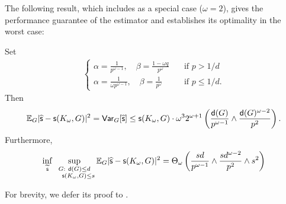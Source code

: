 The following result, which includes  as a special case ($\omega=2$), gives the performance guarantee of the estimator  and establishes its optimality in the worst case:
\begin{theorem}[Cliques]
\label{thm:neighborhood_clique}
Set
\begin{align}
\begin{cases}
  \alpha =  \frac{1}{p^{\omega-1}}, \quad \beta = \frac{1-\omega q}{p^{\omega}}  & \quad \text{if } p > 1/d \\
  \alpha=  \frac{1}{\omega p^{\omega-1}}, \quad \beta = \frac{1}{p^{\omega}}  & \quad \text{if } p \leq 1/d.
  \end{cases}
\label{eq:alphabeta-general}
\end{align}
Then
\[
\mathbb{E}_G|\widehat{\mathsf{s}}-\mathsf{s}(K_{\omega}, G)|^2 = 
\mathsf{Var}_G[\widehat{\mathsf{s}}]
\leq \mathsf{s}(K_{\omega}, G) \cdot \omega^3 2^{\omega+1} \left(  \frac{ {\mathsf{d}}(G)}{p^{\omega-1}} \wedge  \frac{{\mathsf{d}}(G)^{\omega-2}}{p^2} \right).
\]
Furthermore,
\[
\inf_{\widetilde{\mathsf{s}}} \sup_{\substack{G: ~{\mathsf{d}}(G)\leq d\\ ~~~\mathsf{s}(K_\omega,G) \leq s}} 
\mathbb{E}_G|\widehat{\mathsf{s}}-\mathsf{s}(K_{\omega}, G)|^2 = \Theta_{\omega} \left( \frac{s d}{p^{\omega-1}} \wedge  \frac{s d^{\omega-2}}{p^2} \wedge s^2 \right)
\]
\end{theorem}
For brevity, we defer its proof to .

